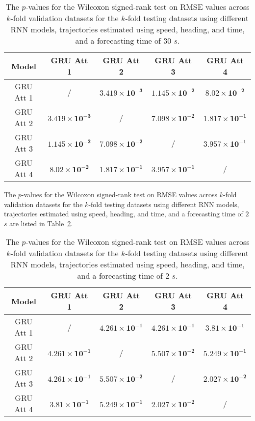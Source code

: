\begin{table}[!ht]
	\centering
	\begin{tabular}{|c|c|c|c|c|}
		\hline
		Model & GRU Att 1 & GRU Att 2 & GRU Att 3 & GRU Att 4 \\ \hline
		GRU Att 1 & / & $\mathbf{3.419 \times 10^{-3}}$ & $\mathbf{1.145 \times 10^{-2}}$ & $\mathbf{8.02 \times 10^{-2}}$ \\ \hline
		GRU Att 2 & $\mathbf{3.419 \times 10^{-3}}$ & / & $\mathbf{7.098 \times 10^{-2}}$ & $\mathbf{1.817 \times 10^{-1}}$ \\ \hline
		GRU Att 3 & $\mathbf{1.145 \times 10^{-2}}$ & $\mathbf{7.098 \times 10^{-2}}$ & / & $\mathbf{3.957 \times 10^{-1}}$ \\ \hline
		GRU Att 4 & $\mathbf{8.02 \times 10^{-2}}$ & $\mathbf{1.817 \times 10^{-1}}$ & $\mathbf{3.957 \times 10^{-1}}$ & / \\ \hline
	\end{tabular}
	\caption{The $p$-values for the Wilcoxon signed-rank test on RMSE values across $k$-fold validation datasets for the $k$-fold testing datasets using different RNN models, trajectories estimated using speed, heading, and time, and a forecasting time of $30$ $s$.}
	\label{tab:RMSE:speed:actual:dir:p:30}
\end{table}

The $p$-values for the Wilcoxon signed-rank test on RMSE values across $k$-fold validation datasets for the $k$-fold testing datasets using different RNN models, trajectories estimated using speed, heading, and time, and a forecasting time of $2$ $s$ are listed in Table~\ref{tab:RMSE:speed:actual:dir:p:2}.

\begin{table}[!ht]
	\centering
	\begin{tabular}{|c|c|c|c|c|}
		\hline
		Model & GRU Att 1 & GRU Att 2 & GRU Att 3 & GRU Att 4 \\ \hline
		GRU Att 1 & / & $\mathbf{4.261 \times 10^{-1}}$ & $\mathbf{4.261 \times 10^{-1}}$ & $\mathbf{3.81 \times 10^{-1}}$ \\ \hline
		GRU Att 2 & $\mathbf{4.261 \times 10^{-1}}$ & / & $\mathbf{5.507 \times 10^{-2}}$ & $\mathbf{5.249 \times 10^{-1}}$ \\ \hline
		GRU Att 3 & $\mathbf{4.261 \times 10^{-1}}$ & $\mathbf{5.507 \times 10^{-2}}$ & / & $\mathbf{2.027 \times 10^{-2}}$ \\ \hline
		GRU Att 4 & $\mathbf{3.81 \times 10^{-1}}$ & $\mathbf{5.249 \times 10^{-1}}$ & $\mathbf{2.027 \times 10^{-2}}$ & / \\ \hline
	\end{tabular}
	\caption{The $p$-values for the Wilcoxon signed-rank test on RMSE values across $k$-fold validation datasets for the $k$-fold testing datasets using different RNN models, trajectories estimated using speed, heading, and time, and a forecasting time of $2$ $s$.}
	\label{tab:RMSE:speed:actual:dir:p:2}
\end{table}

